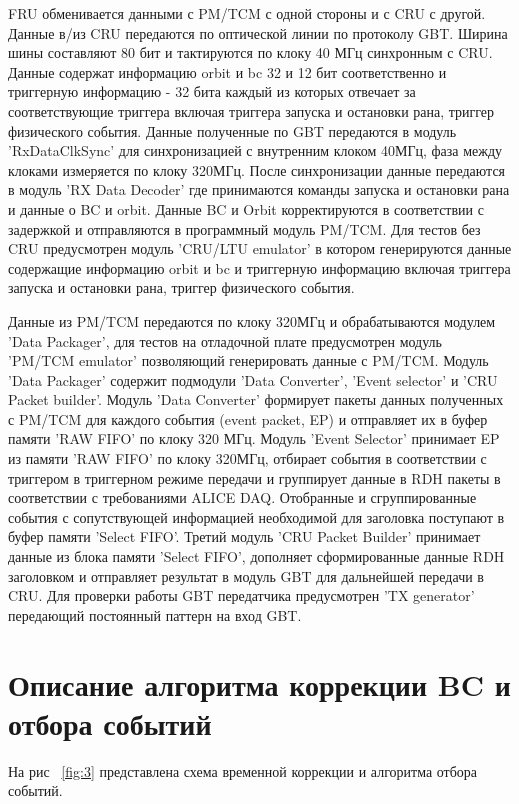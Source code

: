 \documentclass{article}
\begin{document}
FRU обменивается данными с PM/TCM с одной стороны и с CRU с другой. Данные в/из CRU передаются по оптической линии по протоколу GBT. Ширина шины составляют 80 бит и тактируются по клоку 40 МГц синхронным с CRU. Данные содержат информацию  orbit и bc 32 и 12 бит соответственно и триггерную информацию - 32 бита каждый из которых отвечает за соответствующие триггера включая триггера запуска и остановки рана, триггер физического события. Данные полученные по GBT передаются в модуль 'RxDataClkSync' для синхронизацией с внутренним клоком 40МГц, фаза между клоками измеряется по клоку 320МГц. После синхронизации данные передаются в модуль 'RX Data Decoder' где принимаются команды запуска и остановки рана и данные о BC и orbit. Данные BC и Orbit корректируются в соответствии с задержкой и отправляются в программный модуль PM/TCM. Для тестов без CRU предусмотрен модуль 'CRU/LTU emulator' в котором генерируются данные содержащие информацию  orbit и bc и триггерную информацию включая триггера запуска и остановки рана, триггер физического события.


Данные из PM/TCM передаются по клоку 320МГц и обрабатываются модулем 'Data Packager', для тестов на отладочной плате предусмотрен модуль 'PM/TCM emulator' позволяющий генерировать данные с PM/TCM. Модуль 'Data Packager' содержит подмодули 'Data Converter', 'Event selector' и 'CRU Packet builder'. Модуль 'Data Converter' формирует пакеты данных полученных с PM/TCM для каждого события (event packet, EP) и отправляет их в буфер памяти 'RAW FIFO' по клоку 320 МГц. Модуль 'Event Selector' принимает EP из памяти 'RAW FIFO' по клоку 320МГц, отбирает события в соответствии с триггером в триггерном режиме передачи и группирует данные в RDH пакеты в соответствии с требованиями ALICE DAQ. Отобранные и сгруппированные события с сопутствующей информацией необходимой для заголовка поступают в буфер памяти 'Select FIFO'. Третий модуль 'CRU Packet Builder' принимает данные из блока памяти 'Select FIFO', дополняет сформированные данные RDH заголовком и отправляет результат в модуль GBT для дальнейшей передачи в CRU. Для проверки работы GBT передатчика предусмотрен 'TX generator' передающий постоянный паттерн на вход GBT.

\section{Описание алгоритма коррекции BC и отбора событий}
На рис ~\ref{fig:3} представлена схема временной коррекции и алгоритма отбора событий. 
\end{document}
